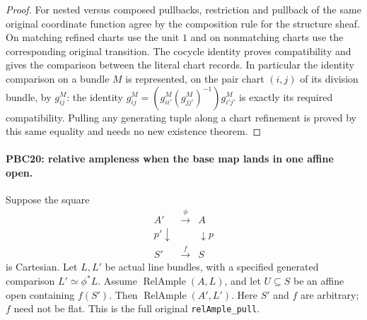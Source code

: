 \begin{proof}
For nested versus composed pullbacks, restriction and pullback
of the same original coordinate function agree by the
composition rule for the structure sheaf.  On matching
refined charts use the unit $1$ and on nonmatching charts
use the corresponding original transition.  The cocycle
identity proves compatibility and gives the comparison
between the literal chart records.  In particular the
identity comparison on a bundle $M$ is represented, on
the pair chart $(i,j)$ of its division bundle, by $g^M_{ij}$:
the identity
$g^M_{ij}=(g^M_{ii'}(g^M_{jj'})^{-1})g^M_{i'j'}$
is exactly its required compatibility.
Pulling any generating tuple along a chart refinement is
proved by this same equality and needs no new existence theorem.
\end{proof}

\paragraph{PBC20: relative ampleness when the base map lands in one affine open.}
\label{claim:PBC20}
Suppose the square
\[
 \begin{array}{ccc}
 A'&\xrightarrow{\phi}&A\\
 p'\downarrow&&\downarrow p\\
 S'&\xrightarrow{f}&S
 \end{array}
                                                        \tag{PBC.40}
\]
is Cartesian.  Let $L,L'$ be actual line bundles, with a
specified generated comparison $L'\simeq\phi^*L$.
Assume $\operatorname{RelAmple}(A,L)$, and let $U\subseteq S$
be an affine open containing $f(S')$.
Then $\operatorname{RelAmple}(A',L')$.
Here $S'$ and $f$ are arbitrary; $f$ need not be flat.
This is the full original \texttt{relAmple\_pull}.

